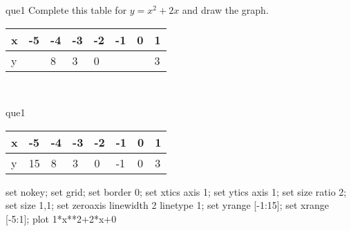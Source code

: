 \documentclass[13.5pt, varwidth=true]{beamer}
\begin{document}
\begin{frame}[shrink=19,fragile]
	\begin{beamercolorbox}[rounded=true, left, shadow=true,wd=14.8cm]{que1}
		 Complete this table for $y = x^{2} + 2x$ and draw the graph. \\[0.3cm] \renewcommand{\arraystretch}{1.2}\begin{tabular}{|C|C|C|C|C|C|C|C|} \hline x & -5 & -4 & -3 & -2 & -1 & 0 & 1 \\ \hline y &  & 8 & 3 & 0 &  &  & 3\\ \hline \end{tabular}\\[0.3cm]
	\end{beamercolorbox}
\end{frame}
\begin{frame}[shrink=19,fragile]
	\begin{beamercolorbox}[rounded=true, left, shadow=true,wd=14.8cm]{que1}
		\renewcommand{\arraystretch}{1.2}\begin{tabular}{|C|C|C|C|C|C|C|C|} \hline x & -5 & -4 & -3 & -2 & -1 & 0 & 1 \\ \hline y & 15 & 8 & 3 & 0 & -1 & 0 & 3\\ \hline \end{tabular}\begin{gnuplot}[terminal=pdf] set nokey; set grid; set border 0; set xtics axis 1; set ytics axis 1; set size ratio 2; set size 1,1; set zeroaxis linewidth 2 linetype 1; set yrange [-1:15]; set xrange [-5:1]; plot 1*x**2+2*x+0 \end{gnuplot}
	\end{beamercolorbox}
\end{frame}
\end{document}
